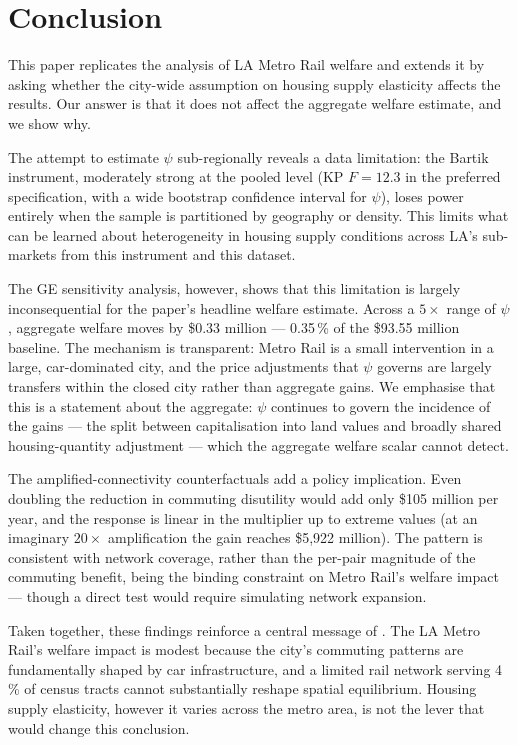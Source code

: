 \documentclass[12pt,a4paper]{article}
\begin{document}
\section{Conclusion}
\label{sec:conclusion}

This paper replicates the \citet{severen2021} analysis of LA Metro Rail welfare
and extends it by asking whether the city-wide assumption on housing supply
elasticity affects the results.  Our answer is that it does not affect the
aggregate welfare estimate, and we show why.

The attempt to estimate $\psi$ sub-regionally reveals a data limitation: the
Bartik instrument, moderately strong at the pooled level (KP $F = 12.3$ in the
preferred specification, with a wide bootstrap confidence interval for $\psi$),
loses power entirely when the sample is partitioned by geography or density.
This limits what can be learned about heterogeneity in housing supply conditions
across LA's sub-markets from this instrument and this dataset.

The GE sensitivity analysis, however, shows that this limitation is largely
inconsequential for the paper's headline welfare estimate.  Across a $5\times$
range of $\psi$, aggregate welfare moves by \$0.33 million --- 0.35\,\% of the
\$93.55 million baseline.  The mechanism is transparent: Metro Rail is a small
intervention in a large, car-dominated city, and the price adjustments that
$\psi$ governs are largely transfers within the closed city rather than
aggregate gains.  We emphasise that this is a statement about the aggregate:
$\psi$ continues to govern the incidence of the gains --- the split between
capitalisation into land values and broadly shared housing-quantity adjustment
--- which the aggregate welfare scalar cannot detect.

The amplified-connectivity counterfactuals add a policy implication.  Even
doubling the reduction in commuting disutility would add only \$105 million per
year, and the response is linear in the multiplier up to extreme values (at an
imaginary $20\times$ amplification the gain reaches \$5{,}922 million).  The
pattern is consistent with network coverage, rather than the per-pair magnitude
of the commuting benefit, being the binding constraint on Metro Rail's welfare
impact --- though a direct test would require simulating network expansion.

Taken together, these findings reinforce a central message of
\citet{severen2021}. The LA Metro Rail's welfare impact is modest because the city's
commuting patterns are fundamentally shaped by car infrastructure, and a limited
rail network serving 4\,\% of census tracts cannot substantially reshape spatial
equilibrium.  Housing supply elasticity, however it varies across the metro
area, is not the lever that would change this conclusion.
\end{document}
